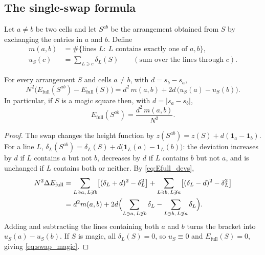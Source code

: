 \subsection{The single-swap formula}
\label{sec:theory_swap}

Let $a\ne b$ be two cells and let $S^{ab}$ be the arrangement obtained from $S$ by exchanging the entries in
$a$ and $b$.  Define
\begin{align*}
m(a,b)&=\#\{\text{lines }L:\ L\text{ contains exactly one of }a,b\},\\
u_S(c)&=\sum_{L\ni c}\delta_L(S)\qquad(\text{sum over the lines through }c).
\end{align*}

\begin{theorem}
\label{thm:swap}
For every arrangement $S$ and cells $a\ne b$, with $d=s_b-s_a$,
\begin{equation}
N^{2}\bigl(E_{\mathrm{full}}(S^{ab})-E_{\mathrm{full}}(S)\bigr)=d^{2}\,m(a,b)+2d\,\bigl(u_S(a)-u_S(b)\bigr).
\label{eq:swap_general}
\end{equation}
In particular, if $S$ is a magic square then, with $d=|s_a-s_b|$,
\begin{equation}
E_{\mathrm{full}}(S^{ab})=\frac{d^{2}\,m(a,b)}{N^{2}} .
\label{eq:swap_magic}
\end{equation}
\end{theorem}

\begin{proof}
The swap changes the height function by $z(S^{ab})=z(S)+d(\mathbf 1_a-\mathbf 1_b)$.  For a line $L$,
$\delta_L(S^{ab})=\delta_L(S)+d\bigl(\mathbf 1_L(a)-\mathbf 1_L(b)\bigr)$: the deviation increases by $d$ if $L$
contains $a$ but not $b$, decreases by $d$ if $L$ contains $b$ but not $a$, and is unchanged if $L$ contains both
or neither.  By \eqref{eq:Efull_devs},
\begin{align*}
N^{2}\Delta E_{\mathrm{full}}&=\sum_{L\ni a,\,L\not\ni b}\bigl[(\delta_L+d)^{2}-\delta_L^{2}\bigr]
+\sum_{L\ni b,\,L\not\ni a}\bigl[(\delta_L-d)^{2}-\delta_L^{2}\bigr]\\
&=d^{2}m(a,b)+2d\Bigl(\sum_{L\ni a,\,L\not\ni b}\delta_L-\sum_{L\ni b,\,L\not\ni a}\delta_L\Bigr).
\end{align*}
Adding and subtracting the lines containing both $a$ and $b$ turns the bracket into $u_S(a)-u_S(b)$.
If $S$ is magic, all $\delta_L(S)=0$, so $u_S\equiv0$ and $E_{\mathrm{full}}(S)=0$, giving \eqref{eq:swap_magic}.
\end{proof}

